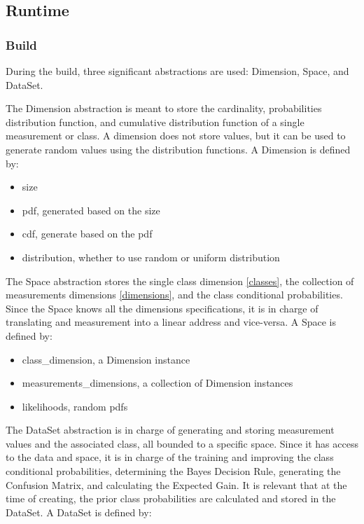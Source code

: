 \documentclass[letterpaper, conference]{IEEEtran}
\begin{document}
\subsection{Runtime}

\subsubsection{Build}

During the build, three significant abstractions are used: Dimension, Space, and DataSet.

The Dimension abstraction is meant to store the cardinality, probabilities distribution function, and cumulative distribution function of a single measurement or class. A dimension does not store values, but it can be used to generate random values using the distribution functions. A Dimension is defined by:

\begin{itemize}
  \item size
  \item pdf, generated based on the size
  \item cdf, generate based on the pdf
  \item distribution, whether to use random or uniform distribution
\end{itemize}

The Space abstraction stores the single class dimension \ref{classes}, the collection of measurements dimensions \ref{dimensions}, and the class conditional probabilities. Since the Space knows all the dimensions specifications, it is in charge of translating and measurement into a linear address and vice-versa. A Space is defined by:

\begin{itemize}
\item class\_dimension, a Dimension instance
\item measurements\_dimensions, a collection of Dimension instances
\item likelihoods, random pdfs
\end{itemize}

The DataSet abstraction is in charge of generating and storing measurement values and the associated class, all bounded to a specific space. Since it has access to the data and space, it is in charge of the training and improving the class conditional probabilities, determining the Bayes Decision Rule, generating the Confusion Matrix, and calculating the Expected Gain. It is relevant that at the time of creating, the prior class probabilities are calculated and stored in the DataSet. A DataSet is defined by:
\end{document}
